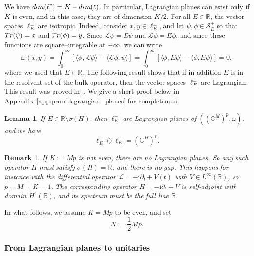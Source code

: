 \documentclass[11pt]{amsart}
\numberwithin{equation}{section} %
\newtheorem{remark}[theorem]{Remark}
\newtheorem{lemma}[theorem]{Lemma}
\newcommand\1{{\mathds 1}}
\def\C{{\mathbb C}}
\def\R{{\mathbb R}}
\def\ri{{\mathrm{i}}}
\def\cL{{\mathcal L}}
\def\cS{{\mathcal S}}
\def\Tr{{\rm Tr}}
\def\dim{{\rm dim }}
\begin{document}
We have $\dim(\ell^\circ) = K - \dim(\ell)$. In particular, Lagrangian planes can exist only if $K$ is even, and in this case, they are of dimension $K/2$. For all $E \in \R$, the vector spaces $\ell_E^\pm$ are isotropic. Indeed, consider $x, y \in \ell_E^\pm$, and let $\psi, \phi \in \cS_E^+$ so that $\Tr(\psi) = x$ and $\Tr(\phi) = y$. Since $\cL \psi = E \psi$ and $\cL \phi = E \phi$, and since these functions are square--integrable at $+ \infty$, we can write
\begin{equation} \label{eq:isotropic}
    \omega(x,y) = \int_0^\infty [ \langle \phi, \cL \psi \rangle - \langle \cL \phi, \psi \rangle ] = 
    \int_0^\infty [ \langle \phi, E \psi \rangle - \langle \phi, E \psi \rangle ] = 0,
\end{equation}
where we used that $E \in \R$. The following result shows that if in addition $E$ is in the resolvent set of the bulk operator, then the vector spaces $\ell_E^\pm$ are Lagrangian. This result was proved in~\cite[Theorem 17]{Gon-23}. We give a short proof below in Appendix~\ref{app:proof:lagrangian_planes} for completeness.

\begin{lemma} \label{lem:lEpm_are_Lagrangian_planes} If $E \in \R \setminus \sigma(H)$, then $\ell_E^\pm$ are Lagrangian planes of $((\C^{M})^p, \omega)$, and we have
    \[
        \ell_E^+ \oplus \ell_E^- = (\C^{M})^p.
    \]
\end{lemma}




\begin{remark} \label{rem:Mp_is_even}
    If $K := Mp$ is not even, there are no Lagrangian planes. So any such operator $H$ must satisfy $\sigma(H) = \R$, and there is no gap. This happens for instance with the differential operator $\cL = - \ri \partial_t + V(t)$ with $V \in L^\infty(\R)$, so $p  = M = K = 1$. The corresponding operator $H = - \ri \partial_t + V$ is self-adjoint with domain $H^1(\R)$, and its spectrum must be the full line $\R$.
\end{remark}
In what follows, we assume $K = Mp$ to be even, and set 
\[
    N := \frac12 Mp.
\]


\subsubsection{From Lagrangian planes to unitaries}
\end{document}
